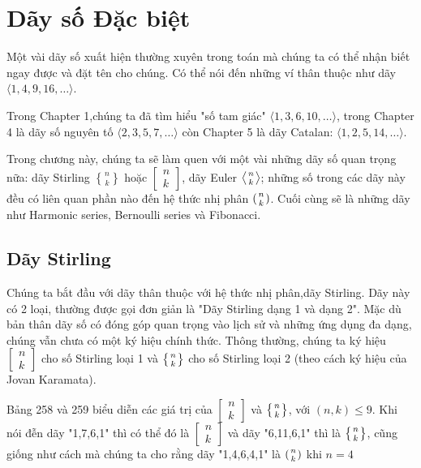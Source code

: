 \chapter{Dãy số Đặc biệt}\label{ch:6}

Một vài dãy số xuất hiện thường xuyên trong toán mà chúng ta có thể nhận biết ngay được và đặt tên cho chúng. 
Có thể nói đến những ví thân thuộc như dãy $\langle 1,4,9,16,\ldots \rangle$.

\noindent

Trong Chapter 1,chúng ta đã tìm hiểu "số tam giác" 
$\langle 1,3,6,10,\ldots \rangle$,
trong Chapter 4 là dãy số nguyên tố
$\langle 2,3,5,7,\ldots \rangle$ 
còn Chapter 5 là dãy Catalan:
$\langle 1,2,5,14,\ldots \rangle$.

\noindent

Trong chương này, chúng ta sẽ làm quen với một vài những dãy số quan trọng nữa: 
dãy Stirling $n \brace k$ hoặc $\begin{bmatrix} n \\ k \end{bmatrix}$, 
dãy Euler ${\displaystyle \textstyle \left\langle {n \atop k}\right\rangle }$; 
những số trong các dãy này đều có liên quan phần nào đến hệ thức nhị phân 
$({n \atop k})$.
Cuối cùng sẽ là những dãy như Harmonic series, Bernoulli series và Fibonacci.

\section{Dãy Stirling}

\noindent 

Chúng ta bắt đầu với dãy thân thuộc với hệ thức nhị phân,dãy Stirling.
Dãy này có 2 loại, thường được gọi đơn giản là "Dãy Stirling dạng 1 và dạng 2". 
Mặc dù bản thân dãy số có đóng góp quan trọng vào lịch sử và những ứng dụng đa dạng,
chúng vẫn chưa có một ký hiệu chính thức. Thông thường, chúng ta ký hiệu 
$\begin{bmatrix} n \\ k \end{bmatrix}$  
cho số Stirling loại 1 và
${\displaystyle \textstyle \left \{ {n \atop k} \right \} }$
cho số Stirling loại 2 (theo cách ký hiệu của Jovan Karamata).

\noindent 

Bảng 258 và 259 biểu diễn các giá trị của
$\begin{bmatrix} n \\ k \end{bmatrix}$  
và 
${\displaystyle \textstyle \left \{ {n \atop k} \right \} }$, 
với $(n,k) \leq 9$. Khi nói đễn dãy "1,7,6,1" thì có thể đó là 
$\begin{bmatrix} n \\ k \end{bmatrix}$
và dãy "6,11,6,1" thì là 
${\displaystyle \textstyle \left \{ {n \atop k} \right \} }$, 
cũng giống như cách mà chúng ta cho rằng dãy "1,4,6,4,1" là $({n \atop k})$ khi $n = 4$

